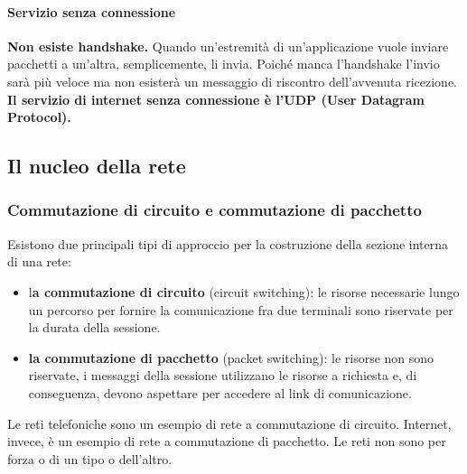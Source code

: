 \documentclass[11pt,a4paper]{article}
\begin{document}
\paragraph{Servizio senza connessione}
\textbf{Non esiste handshake.} Quando un’estremità di un’applicazione vuole inviare pacchetti a un’altra, semplicemente, li invia. Poiché manca l’handshake l’invio sarà più veloce ma non esisterà un messaggio di riscontro dell’avvenuta ricezione.
\textbf{Il servizio di internet senza connessione è l’UDP (User Datagram Protocol).}

\subsection{Il nucleo della rete}
\subsubsection{Commutazione di circuito e commutazione di pacchetto}
Esistono due principali tipi di approccio per la costruzione della sezione interna di una rete:
\begin{itemize}
	\item l\textbf{a commutazione di circuito} (circuit switching): le risorse necessarie lungo un percorso per fornire la comunicazione fra due terminali sono riservate per la durata della sessione.
	\item \textbf{la commutazione di pacchetto} (packet switching): le risorse non sono riservate, i messaggi della sessione utilizzano le risorse a richiesta e, di conseguenza, devono aspettare per accedere al link di comunicazione.
\end{itemize}
Le reti telefoniche sono un esempio di rete a commutazione di circuito. Internet, invece, è un esempio di rete a commutazione di pacchetto. Le reti non sono per forza o di un tipo o dell’altro.
\end{document}
